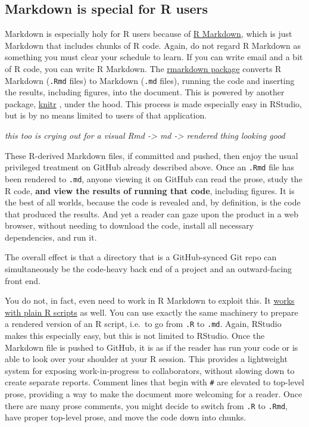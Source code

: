 \documentclass[12pt]{article}
\begin{document}
\subsection{Markdown is special for R
users}\label{markdown-is-special-for-r-users}

Markdown is especially holy for R users because of
\href{http://rmarkdown.rstudio.com}{R Markdown}, which is just Markdown
that includes chunks of R code. Again, do not regard R Markdown as
something you must clear your schedule to learn. If you can write email
and a bit of R code, you can write R Markdown. The
\href{https://CRAN.R-project.org/package=rmarkdown}{rmarkdown package}
\citep{rmd-pkg} converts R Markdown (\texttt{.Rmd} files) to Markdown
(\texttt{.md} files), running the code and inserting the results,
including figures, into the document. This is powered by another
package, \href{https://CRAN.R-project.org/package=knitr}{knitr}
\citep{knitr-pkg, knitr-book}, under the hood. This process is made
especially easy in RStudio, but is by no means limited to users of that
application.

\emph{this too is crying out for a visual Rmd -\textgreater{} md
-\textgreater{} rendered thing looking good}

These R-derived Markdown files, if committed and pushed, then enjoy the
usual privileged treatment on GitHub already described above. Once an
\texttt{.Rmd} file has been rendered to \texttt{.md}, anyone viewing it
on GitHub can read the prose, study the R code, \textbf{and view the
results of running that code}, including figures. It is the best of all
worlds, because the code is revealed and, by definition, is the code
that produced the results. And yet a reader can gaze upon the product in
a web browser, without needing to download the code, install all
necessary dependencies, and run it.

The overall effect is that a directory that is a GitHub-synced Git repo
can simultaneously be the code-heavy back end of a project and an
outward-facing front end.

You do not, in fact, even need to work in R Markdown to exploit this. It
\href{http://rmarkdown.rstudio.com/articles_report_from_r_script.html}{works
with plain R scripts} as well. You can use exactly the same machinery to
prepare a rendered version of an R script, i.e.~to go from \texttt{.R}
to \texttt{.md}. Again, RStudio makes this especially easy, but this is
not limited to RStudio. Once the Markdown file is pushed to GitHub, it
is as if the reader has run your code or is able to look over your
shoulder at your R session. This provides a lightweight system for
exposing work-in-progress to collaborators, without slowing down to
create separate reports. Comment lines that begin with
\texttt{\#\textquotesingle{}} are elevated to top-level prose, providing
a way to make the document more welcoming for a reader. Once there are
many prose comments, you might decide to switch from \texttt{.R} to
\texttt{.Rmd}, have proper top-level prose, and move the code down into
chunks.
\end{document}
